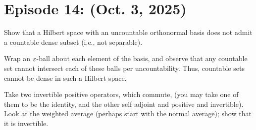 \section{Episode 14: (Oct. 3, 2025)}
\begin{exercise}
    Show that a Hilbert space with an uncountable orthonormal basis does not admit a countable dense subset (i.e., not separable).
\end{exercise}
\noindent Wrap an $\varepsilon$-ball about each element of the basis, and observe that any countable set cannot intersect each of these balls per uncountability. Thus, countable sets cannot be dense in such a Hilbert space.
\begin{exercise}
    Take two invertible positive operators, which commute, (you may take one of them to be the identity, and the other self adjoint and positive and invertible). Look at the weighted average (perhaps start with the normal average); show that it is invertible.
\end{exercise}